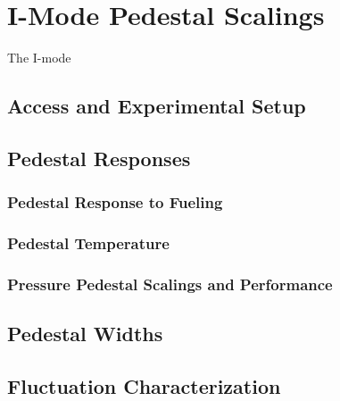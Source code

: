 \chapter{I-Mode Pedestal Scalings}\label{ch:ImodePedestal}

The I-mode \cite{Whyte2010,Hubbard2011}

\section{Access and Experimental Setup}\label{sec:imode_setup}

\nicesectionending

\section{Pedestal Responses}\label{sec:imode_height}

\subsection{Pedestal Response to Fueling}\label{subsec:imode_fueling}

\subsection{Pedestal Temperature}\label{subsec:imode_temp}

\subsection{Pressure Pedestal Scalings and Performance}\label{subsec:imode_pres}

\nicesectionending

\section{Pedestal Widths}\label{sec:imode_width}

\nicesectionending

\section{Fluctuation Characterization}\label{sec:imode_fluct}

\nicechapterending


